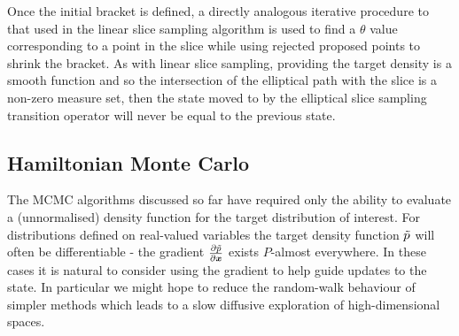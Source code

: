 Once the initial bracket is defined, a directly analogous iterative procedure to that used in the linear slice sampling algorithm is used to find a $\theta$ value corresponding to a point in the slice while using rejected proposed points to shrink the bracket. As with linear slice sampling, providing the target density is a smooth function and so the intersection of the elliptical path with the slice is a non-zero measure set, then the state moved to by the elliptical slice sampling transition operator will never be equal to the previous state.

\subsection{Hamiltonian Monte Carlo}\label{subsec:hamiltonian-monte-carlo}

The \ac{MCMC} algorithms discussed so far have required only the ability to evaluate a (unnormalised) density function for the target distribution of interest. For distributions defined on real-valued variables the target density function $\tilde{p}$ will often be differentiable - the gradient $\frac{\partial \tilde{p}}{\partial \boldsymbol{x}}$ exists $P$-almost everywhere. In these cases it is natural to consider using the gradient to help guide updates to the state. In particular we might hope to reduce the random-walk behaviour of simpler methods which leads to a slow diffusive exploration of high-dimensional spaces.

